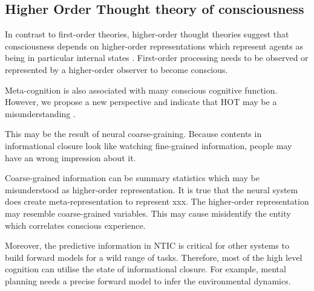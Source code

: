 \documentclass[utf8]{article}
\begin{document}
			
		\subsection{Higher Order Thought theory of consciousness}
		    In contrast to first-order theories, higher-order thought theories suggest that consciousness depends on higher-order representations which represent agents as being in particular internal states \citep{lau2011empirical}. First-order processing needs to be observed or represented by a higher-order observer to become conscious. 
		    
		    
		    Meta-cognition is also associated with many conscious cognitive function. However, we propose a new perspective and indicate that HOT may be a misunderstanding . 
		    
		    
		    This may be the result of neural coarse-graining. Because contents in informational closure look like watching fine-grained information, people may have an wrong impression about it. 
		    
		    
		    Coarse-grained information can be summary statistics which may be misunderstood as higher-order representation. It is true that the neural system does create  meta-representation to represent xxx. The higher-order representation may resemble coarse-grained variables. This may cause misidentify the entity which correlates conscious experience.  
		    
		    Moreover, the predictive information in NTIC is critical for other systems to build forward models for a wild range of tasks. Therefore, most of the high level cognition can utilise the state of informational closure. For example, mental planning needs a precise forward model to infer the environmental dynamics.
\end{document}
